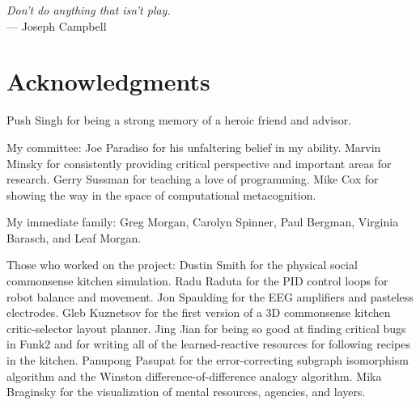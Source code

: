 



\begin{flushright}{\slshape    
Don't do anything that isn't play.} \\ \medskip
    --- Joseph Campbell
\end{flushright}



\bigskip

\begingroup
\let\clearpage\relax
\let\cleardoublepage\relax
\let\cleardoublepage\relax
\chapter*{Acknowledgments}

Push Singh for being a strong memory of a heroic friend and advisor.

\vspace{5mm}

\noindent My committee:
Joe Paradiso for his unfaltering belief in my ability.
Marvin Minsky for consistently providing critical perspective and important areas for research.
Gerry Sussman for teaching a love of programming.
Mike Cox for showing the way in the space of computational metacognition.

\vspace{5mm}

\noindent My immediate family:
Greg Morgan, Carolyn Spinner, Paul Bergman, Virginia Barasch, and Leaf Morgan.

\vspace{5mm}

\noindent Those who worked on the project:
Dustin Smith for the physical social commonsense kitchen simulation.
Radu Raduta for the PID control loops for robot balance and movement.
Jon Spaulding for the EEG amplifiers and pasteless electrodes.
Gleb Kuznetsov for the first version of a 3D commonsense kitchen critic-selector layout planner.
Jing Jian for being so good at finding critical bugs in Funk2 and for writing all of the learned-reactive resources for following recipes in the kitchen.
Panupong Pasupat for the error-correcting subgraph isomorphism algorithm and the Winston difference-of-difference analogy algorithm.
Mika Braginsky for the visualization of mental resources, agencies, and layers.

